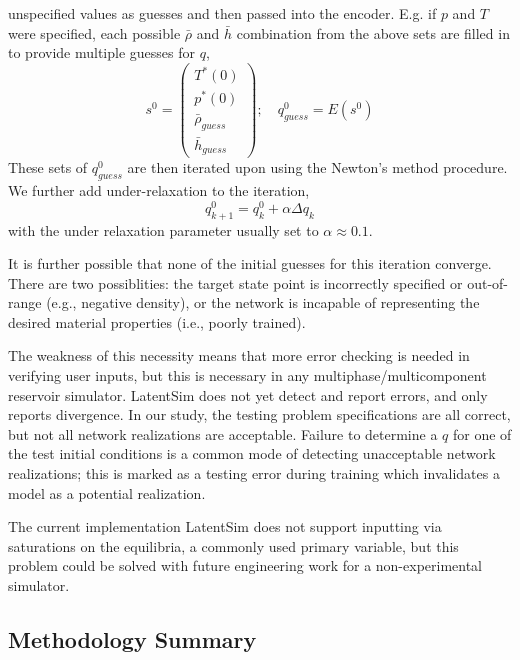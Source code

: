 \documentclass[]{article}
\begin{document}
unspecified values as guesses and then passed into the encoder.
E.g. if $p$ and $T$ were specified, each possible $\bar{\rho}$ and
$\bar{h}$ combination from the above sets are filled in to provide
multiple guesses for $q$,
\begin{equation}
s^0 = \left(\begin{array}{c}
T^*(0)\\
p^*(0)\\
\bar{\rho}_{guess}\\
\bar{h}_{guess}
\end{array}\right);\quad q^0_{guess}=E\left(s^0\right)
 \end{equation}
 These sets of $q^0_{guess}$ are then iterated upon using the Newton's
 method procedure. We further add
 under-relaxation to the iteration,
 \begin{equation}
q^0_{k+1} =q^0_{k} + \alpha \Delta q_{k}
\end{equation}
with the under relaxation parameter usually set to $\alpha \approx
0.1$.

 It is further possible that none of the initial guesses for this iteration
converge. There are two possiblities: the target state point is
incorrectly specified or out-of-range (e.g., negative density), or the
network is incapable of representing the desired material properties
(i.e., poorly trained). 

The weakness of this necessity means that more error checking is needed
in verifying user inputs, but this is necessary in any
multiphase/multicomponent reservoir simulator. LatentSim does not yet
detect and report errors, and only reports divergence. In our study, the
testing problem specifications are all correct, but not all network
realizations are acceptable. Failure to determine a \(q\) for one of the
test initial conditions is a common mode of detecting unacceptable
network realizations; this is marked as a testing error during training
which invalidates a model as a potential realization.

The current implementation LatentSim does not support inputting via
saturations on the equilibria, a commonly used primary variable, but
this problem could be solved with future engineering work for a
non-experimental simulator.

\hypertarget{header-n3493}{%
\subsection{Methodology Summary}\label{header-n3493}}
\end{document}
